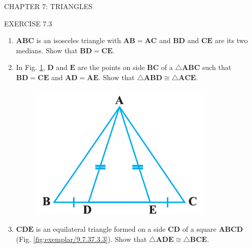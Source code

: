\documentclass{article}
\let\vec\mathbf
\begin{document}
\begin{center}
	\color{blue} CHAPTER 7: TRIANGLES
\end{center}
\begin{center}
	\color{blue} EXERCISE 7.3
\end{center}
\fi

\begin{enumerate}[label=\thesection.\arabic*,ref=\thesection.\theenumi]
	\item $\vec{ABC}$ is an isosceles triangle with $\vec{AB=AC}$ and $\vec{BD}$ and $\vec{CE}$ are its two medians. Show that $\vec{BD=CE}$.
	\item In Fig. \ref{fig:exemplar/9.7.37.3.2}, $\vec{D}$ and $\vec{E}$ are the points on side $\vec{BC}$ of a $\triangle \vec{ABC}$ such that $\vec{BD=CE}$ and $\vec{AD=AE}$. Show that $\triangle \vec{ABD} \cong \triangle \vec{ACE}$.
\begin{figure}[h]
	\centering
	\includegraphics[width=\columnwidth]{exemplar/9.7.3/figs/Figure1.png}
	\caption{}
	\label{fig:exemplar/9.7.37.3.2}
\end{figure}
\item $\vec{CDE}$ is an equilateral triangle formed on a side $\vec{CD}$ of a square $\vec{ABCD}$ (Fig. \ref{fig:exemplar/9.7.37.3.3}). Show that $\triangle \vec{ADE} \cong \triangle \vec{BCE}$.
\begin{figure}[h]
	\centering

\end{figure}
\end{enumerate}
\end{document}
